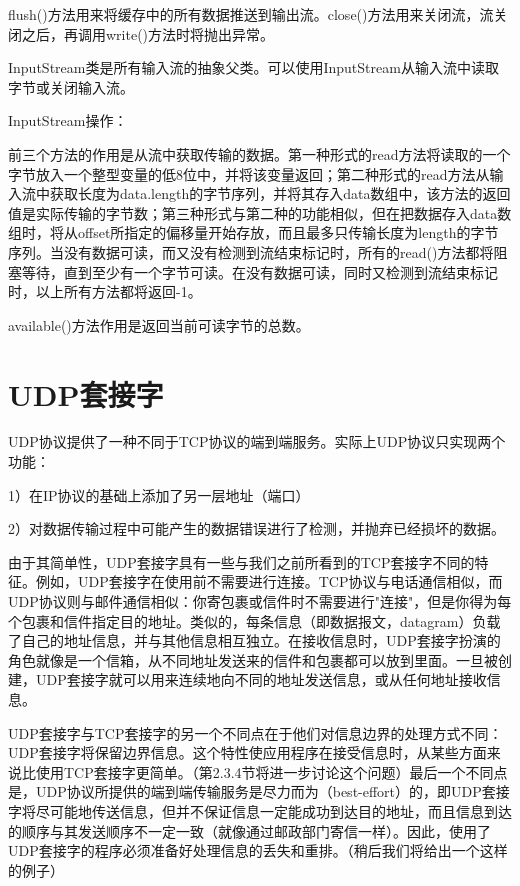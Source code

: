 		flush()方法用来将缓存中的所有数据推送到输出流。close()方法用来关闭流，流关闭之后，再调用write()方法时将抛出异常。

		InputStream类是所有输入流的抽象父类。可以使用InputStream从输入流中读取字节或关闭输入流。
		
		InputStream操作：

		

		前三个方法的作用是从流中获取传输的数据。第一种形式的read方法将读取的一个字节放入一个整型变量的低8位中，并将该变量返回；第二种形式的read方法从输入流中获取长度为data.length的字节序列，并将其存入data数组中，该方法的返回值是实际传输的字节数；第三种形式与第二种的功能相似，但在把数据存入data数组时，将从offset所指定的偏移量开始存放，而且最多只传输长度为length的字节序列。当没有数据可读，而又没有检测到流结束标记时，所有的read()方法都将阻塞等待，直到至少有一个字节可读。在没有数据可读，同时又检测到流结束标记时，以上所有方法都将返回-1。 

		available()方法作用是返回当前可读字节的总数。
		

\section{UDP套接字} 

	UDP协议提供了一种不同于TCP协议的端到端服务。实际上UDP协议只实现两个功能：
	
	1）在IP协议的基础上添加了另一层地址（端口）
	
	2）对数据传输过程中可能产生的数据错误进行了检测，并抛弃已经损坏的数据。
	
	由于其简单性，UDP套接字具有一些与我们之前所看到的TCP套接字不同的特征。例如，UDP套接字在使用前不需要进行连接。TCP协议与电话通信相似，而UDP协议则与邮件通信相似：你寄包裹或信件时不需要进行"连接"，但是你得为每个包裹和信件指定目的地址。类似的，每条信息（即数据报文，datagram）负载了自己的地址信息，并与其他信息相互独立。在接收信息时，UDP套接字扮演的角色就像是一个信箱，从不同地址发送来的信件和包裹都可以放到里面。一旦被创建，UDP套接字就可以用来连续地向不同的地址发送信息，或从任何地址接收信息。 

	UDP套接字与TCP套接字的另一个不同点在于他们对信息边界的处理方式不同：UDP套接字将保留边界信息。这个特性使应用程序在接受信息时，从某些方面来说比使用TCP套接字更简单。（第2.3.4节将进一步讨论这个问题）最后一个不同点是，UDP协议所提供的端到端传输服务是尽力而为（best-effort）的，即UDP套接字将尽可能地传送信息，但并不保证信息一定能成功到达目的地址，而且信息到达的顺序与其发送顺序不一定一致（就像通过邮政部门寄信一样）。因此，使用了UDP套接字的程序必须准备好处理信息的丢失和重排。（稍后我们将给出一个这样的例子） 

